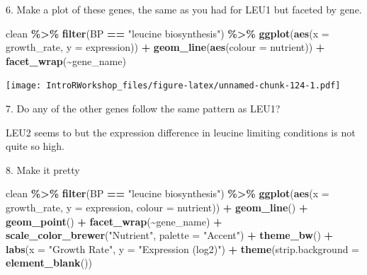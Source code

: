 \documentclass[
]{book}
\newenvironment{Shaded}{\begin{snugshade}}{\end{snugshade}}
\newcommand{\AttributeTok}[1]{\textcolor[rgb]{0.13,0.29,0.53}{#1}}
\newcommand{\FunctionTok}[1]{\textcolor[rgb]{0.13,0.29,0.53}{\textbf{#1}}}
\newcommand{\NormalTok}[1]{#1}
\newcommand{\SpecialCharTok}[1]{\textcolor[rgb]{0.81,0.36,0.00}{\textbf{#1}}}
\newcommand{\StringTok}[1]{\textcolor[rgb]{0.31,0.60,0.02}{#1}}
\begin{document}
6. Make a plot of these genes, the same as you had for LEU1 but faceted by gene.

\begin{Shaded}
\begin{Highlighting}[]
\NormalTok{clean }\SpecialCharTok{\%\textgreater{}\%}
  \FunctionTok{filter}\NormalTok{(BP }\SpecialCharTok{==} \StringTok{"leucine biosynthesis"}\NormalTok{) }\SpecialCharTok{\%\textgreater{}\%}
  \FunctionTok{ggplot}\NormalTok{(}\FunctionTok{aes}\NormalTok{(}\AttributeTok{x =}\NormalTok{ growth\_rate, }\AttributeTok{y =}\NormalTok{ expression)) }\SpecialCharTok{+}
    \FunctionTok{geom\_line}\NormalTok{(}\FunctionTok{aes}\NormalTok{(}\AttributeTok{colour =}\NormalTok{ nutrient)) }\SpecialCharTok{+}
    \FunctionTok{facet\_wrap}\NormalTok{(}\SpecialCharTok{\textasciitilde{}}\NormalTok{gene\_name)}
\end{Highlighting}
\end{Shaded}

\texttt{[image: IntroRWorkshop\_files/figure-latex/unnamed-chunk-124-1.pdf]}

7. Do any of the other genes follow the same pattern as LEU1?

LEU2 seems to but the expression difference in leucine limiting conditions is not quite so high.

8. Make it pretty

\begin{Shaded}
\begin{Highlighting}[]
\NormalTok{clean }\SpecialCharTok{\%\textgreater{}\%}
  \FunctionTok{filter}\NormalTok{(BP }\SpecialCharTok{==} \StringTok{"leucine biosynthesis"}\NormalTok{) }\SpecialCharTok{\%\textgreater{}\%}
  \FunctionTok{ggplot}\NormalTok{(}\FunctionTok{aes}\NormalTok{(}\AttributeTok{x =}\NormalTok{ growth\_rate, }\AttributeTok{y =}\NormalTok{ expression, }\AttributeTok{colour =}\NormalTok{ nutrient)) }\SpecialCharTok{+}
    \FunctionTok{geom\_line}\NormalTok{() }\SpecialCharTok{+}
    \FunctionTok{geom\_point}\NormalTok{() }\SpecialCharTok{+}
    \FunctionTok{facet\_wrap}\NormalTok{(}\SpecialCharTok{\textasciitilde{}}\NormalTok{gene\_name) }\SpecialCharTok{+}
    \FunctionTok{scale\_color\_brewer}\NormalTok{(}\StringTok{"Nutrient"}\NormalTok{, }\AttributeTok{palette =} \StringTok{"Accent"}\NormalTok{) }\SpecialCharTok{+}
    \FunctionTok{theme\_bw}\NormalTok{() }\SpecialCharTok{+}
    \FunctionTok{labs}\NormalTok{(}\AttributeTok{x =} \StringTok{"Growth Rate"}\NormalTok{, }\AttributeTok{y =} \StringTok{"Expression (log2)"}\NormalTok{) }\SpecialCharTok{+}
    \FunctionTok{theme}\NormalTok{(}\AttributeTok{strip.background =} \FunctionTok{element\_blank}\NormalTok{())}
\end{Highlighting}
\end{Shaded}
\end{document}
